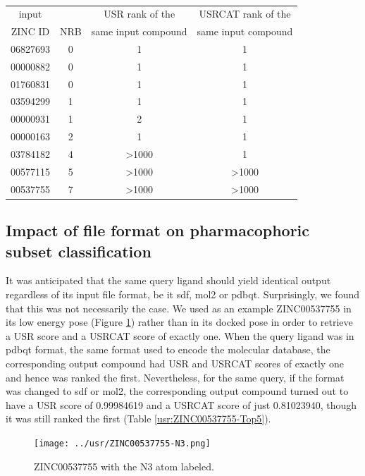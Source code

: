 \begin{table}
\caption{}
\label{usr:RecoveryRate}
\begin{tabular}{cccc}
\hline
input    &     & USR rank of the     & USRCAT rank of the\\
ZINC ID  & NRB & same input compound & same input compound\\
\hline
06827693 &   0 &     1 &     1\\
00000882 &   0 &     1 &     1\\
01760831 &   0 &     1 &     1\\
03594299 &   1 &     1 &     1\\
00000931 &   1 &     2 &     1\\
00000163 &   2 &     1 &     1\\
03784182 &   4 & >1000 &     1\\
00577115 &   5 & >1000 & >1000\\
00537755 &   7 & >1000 & >1000\\
\hline
\end{tabular}
\end{table}

\subsection{Impact of file format on pharmacophoric subset classification}

It was anticipated that the same query ligand should yield identical output regardless of its input file format, be it sdf, mol2 or pdbqt. Surprisingly, we found that this was not necessarily the case. We used as an example ZINC00537755 in its low energy pose (Figure \ref{usr:ZINC00537755-N3}) rather than in its docked pose in order to retrieve a USR score and a USRCAT score of exactly one. When the query ligand was in pdbqt format, the same format used to encode the molecular database, the corresponding output compound had USR and USRCAT scores of exactly one and hence was ranked the first. Nevertheless, for the same query, if the format was changed to sdf or mol2, the corresponding output compound turned out to have a USR score of 0.99984619 and a USRCAT score of just 0.81023940, though it was still ranked the first (Table \ref{usr:ZINC00537755-Top5}).

\begin{figure}
\centering
\texttt{[image: ../usr/ZINC00537755-N3.png]}
\caption{ZINC00537755 with the N3 atom labeled.}
\label{usr:ZINC00537755-N3}
\end{figure}

